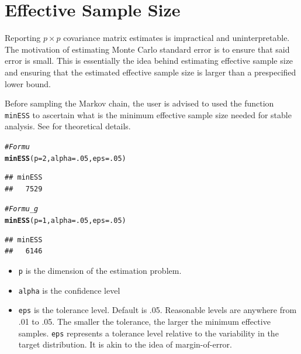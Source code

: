 \documentclass[11pt]{article}\usepackage[]{graphicx}\usepackage[]{color}
\makeatletter
\newcommand{\hlnum}[1]{\textcolor[rgb]{0.686,0.059,0.569}{#1}}%
\newcommand{\hlcom}[1]{\textcolor[rgb]{0.678,0.584,0.686}{\textit{#1}}}%
\newcommand{\hlstd}[1]{\textcolor[rgb]{0.345,0.345,0.345}{#1}}%
\newcommand{\hlkwc}[1]{\textcolor[rgb]{0.333,0.667,0.333}{#1}}%
\newcommand{\hlkwd}[1]{\textcolor[rgb]{0.737,0.353,0.396}{\textbf{#1}}}%
\newenvironment{kframe}{%
 \def\at@end@of@kframe{}%
 \ifinner\ifhmode%
  \def\at@end@of@kframe{\end{minipage}}%
  \begin{minipage}{\columnwidth}%
 \fi\fi%
 \def\FrameCommand##1{\hskip\@totalleftmargin \hskip-\fboxsep
 \colorbox{shadecolor}{##1}\hskip-\fboxsep
     \hskip-\linewidth \hskip-\@totalleftmargin \hskip\columnwidth}%
 \MakeFramed {\advance\hsize-\width
   \@totalleftmargin\z@ \linewidth\hsize
   \@setminipage}}%
 {\par\unskip\endMakeFramed%
 \at@end@of@kframe}
\newenvironment{knitrout}{}{} %
\makeatother
\begin{document}
\section{Effective Sample Size}
Reporting $p \times p$ covariance matrix estimates is impractical and uninterpretable. The motivation of estimating Monte Carlo standard error is to ensure that said error is small. This is essentially the idea behind estimating effective sample size and ensuring that the estimated effective sample size is larger than a prespecified lower bound.

Before sampling the Markov chain, the user is advised to used the function \texttt{minESS} to ascertain what is the minimum effective sample size needed for stable analysis. See \cite{vats:fleg:jones:2017b} for theoretical details.

\begin{knitrout}
\color{fgcolor}\begin{kframe}
\begin{alltt}
\hlcom{# For mu}
\hlkwd{minESS}\hlstd{(}\hlkwc{p} \hlstd{=} \hlnum{2}\hlstd{,} \hlkwc{alpha} \hlstd{=} \hlnum{.05}\hlstd{,} \hlkwc{eps} \hlstd{=} \hlnum{.05}\hlstd{)}
\end{alltt}
\begin{verbatim}
## minESS 
##   7529
\end{verbatim}
\begin{alltt}
\hlcom{#For mu_g}
\hlkwd{minESS}\hlstd{(}\hlkwc{p} \hlstd{=} \hlnum{1}\hlstd{,} \hlkwc{alpha} \hlstd{=} \hlnum{.05}\hlstd{,} \hlkwc{eps} \hlstd{=} \hlnum{.05}\hlstd{)}
\end{alltt}
\begin{verbatim}
## minESS 
##   6146
\end{verbatim}
\end{kframe}
\end{knitrout}

\begin{itemize}
\item \texttt{p} is the dimension of the estimation problem.
\item \texttt{alpha} is the confidence level
\item \texttt{eps} is the tolerance level. Default is .05. Reasonable levels are anywhere from .01 to .05. The smaller the tolerance, the larger the minimum effective samples. \texttt{eps} represents a tolerance level relative to the variability in the target distribution. It is akin to the idea of margin-of-error.
\end{itemize}
\end{document}
